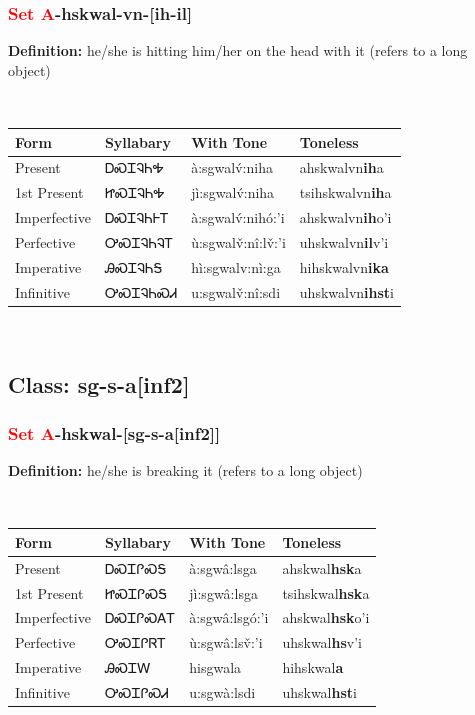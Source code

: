 \subsubsection*{\textcolor{Red}{Set A}{-}\textbf{hskwal}{-}vn{-}[ih-il]}
\nopagebreak
\textbf{Definition: } he/she is hitting him/her on the head with it (refers to a long object)
\\[0.5em]
\begin{tabularx}{\textwidth}{l X X X}%
\toprule%
\textbf{Form}&\textbf{Syllabary}&\textbf{With Tone}&\textbf{Toneless}\\%
\midrule%
Present&ᎠᏍᏆᎸᏂᎭ&à:sgwalv́:niha&ahskwalvn\textbf{ih}a\\%
1st Present&ᏥᏍᏆᎸᏂᎭ&jì:sgwalv́:niha&tsihskwalvn\textbf{ih}a\\%
Imperfective&ᎠᏍᏆᎸᏂᎰᎢ&à:sgwalv́:nihó:’i&ahskwalvn\textbf{ih}o'i\\%
Perfective&ᎤᏍᏆᎸᏂᎸᎢ&ù:sgwalv̌:nî:lv̌:’i&uhskwalvn\textbf{il}v'i\\%
Imperative&ᎯᏍᏆᎸᏂᎦ&hì:sgwalv:nì:ga&hihskwalvn\textbf{ika}\\%
Infinitive&ᎤᏍᏆᎸᏂᏍᏗ&u:sgwalv̌:nî:sdi&uhskwalvn\textbf{ihst}i\\%
\bottomrule%
\end{tabularx}
\\[1em]
\needspace{3in}
\subsection*{Class: sg-s-a[inf2]}
\nopagebreak
\needspace{2in}
\subsubsection*{\textcolor{Red}{Set A}{-}\textbf{hskwal}{-}[sg-s-a[inf2]]}
\nopagebreak
\textbf{Definition: } he/she is breaking it (refers to a long object)
\\[0.5em]
\begin{tabularx}{\textwidth}{l X X X}%
\toprule%
\textbf{Form}&\textbf{Syllabary}&\textbf{With Tone}&\textbf{Toneless}\\%
\midrule%
Present&ᎠᏍᏆᎵᏍᎦ&à:sgwâ:lsga&ahskwal\textbf{hsk}a\\%
1st Present&ᏥᏍᏆᎵᏍᎦ&jì:sgwâ:lsga&tsihskwal\textbf{hsk}a\\%
Imperfective&ᎠᏍᏆᎵᏍᎪᎢ&à:sgwâ:lsgó:’i&ahskwal\textbf{hsk}o'i\\%
Perfective&ᎤᏍᏆᎵᏒᎢ&ù:sgwâ:lsv̌:’i&uhskwal\textbf{hs}v'i\\%
Imperative&ᎯᏍᏆᎳ&hisgwala&hihskwal\textbf{a}\\%
Infinitive&ᎤᏍᏆᎵᏍᏗ&u:sgwà:lsdi&uhskwal\textbf{hst}i\\%
\bottomrule%
\end{tabularx}
\\[1em]
